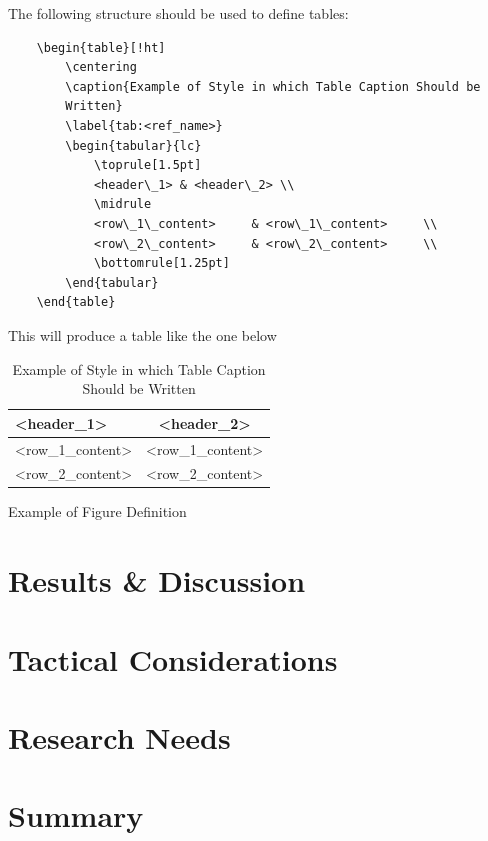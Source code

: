 \documentclass[12pt,oneside]{book}
\begin{document}
The following structure should be used to define tables:
\begin{verbatim}
	\begin{table}[!ht]
	    \centering
	    \caption{Example of Style in which Table Caption Should be 
        Written}
	    \label{tab:<ref_name>}
	    \begin{tabular}{lc}
	        \toprule[1.5pt]
	        <header\_1> & <header\_2> \\
	        \midrule
	        <row\_1\_content>     & <row\_1\_content>     \\
	        <row\_2\_content>     & <row\_2\_content>     \\
	        \bottomrule[1.25pt]
	    \end{tabular}
	\end{table}
\end{verbatim}

This will produce a table like the one below
\begin{table}[!ht]
	\centering
	\caption{Example of Style in which Table Caption Should be Written}
	\label{tab:<ref_name>}
	\begin{tabular}{lc}
		\toprule[1.5pt]
		<header\_1> & <header\_2> \\
		\midrule
		<row\_1\_content>     & <row\_1\_content>     \\
		<row\_2\_content>     & <row\_2\_content>     \\
		\bottomrule[1.25pt]
	\end{tabular}
\end{table}

Example of Figure Definition



\chapter{Results \& Discussion}


\chapter{Tactical Considerations}


\chapter{Research Needs}


\chapter{Summary}




\clearpage

\appendix
\captionsetup{list=no}
\end{document}
